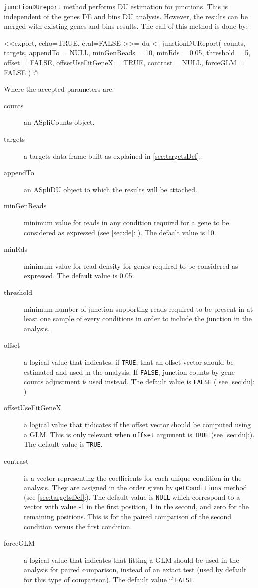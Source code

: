 \documentclass{article}
\newcommand{\secref}[1]{\ref{#1}:\nameref{#1}}
\begin{document}
\texttt{junctionDUreport} method performs DU estimation for junctions. This is
independent of the genes DE and bins DU analysis. However, the results can be
merged with existing genes and bins results. The call of this method is done by:

<<export, echo=TRUE, eval=FALSE >>=
du <- junctionDUReport(  counts, 
                         targets, 
                         appendTo = NULL, 
                         minGenReads = 10,
                         minRds = 0.05,
                         threshold = 5,
                         offset   = FALSE,
                         offsetUseFitGeneX = TRUE,
                         contrast = NULL,
                         forceGLM = FALSE )
@

Where the accepted parameters are:
\begin{description}
  \item[counts] an ASpliCounts object.
  \item[targets] a targets data frame built as explained in 
  \secref{sec:targetsDef}.
  \item[appendTo] an ASpliDU object to which the results will be attached.
  \item[minGenReads] minimum value for reads in any condition required for a
  gene to be considered as expressed (see \secref{sec:de} ). The default value
  is 10.
  \item[minRds] minimum value for read density for genes required to be
  considered as expressed. The default value is 0.05.
  \item[threshold] minimum number of junction supporting reads required to be
  present in at least one sample of every conditions in order to include the
  junction in the analysis.
  \item[offset] a logical value that indicates, if \texttt{TRUE}, that an offset
  vector should be estimated and used in the analysis. If \texttt{FALSE},
  junction counts by gene counts adjustment is used instead. The default value
  is \texttt{FALSE} ( see \secref{sec:du} )
  \item[offsetUseFitGeneX] a logical value that indicates if
  the offset vector should be computed using a GLM. This is only relevant when \texttt{offset}
  argument is \texttt{TRUE} (see \secref{sec:du}). The default value is \texttt{TRUE}.
  \item[contrast] is a vector representing the coefficients for each unique
  condition in the analysis. They are assigned in the order given by
  \texttt{getConditions} method (see \secref{sec:targetsDef}). The default value
  is \texttt{NULL} which correspond to a vector with value -1 in the first
  position, 1 in the second, and zero for the remaining positions. This is for
  the paired comparison of the second condition versus the first condition.
  \item[forceGLM] a logical value that indicates that fitting a GLM should be
  used in the analysis for paired comparison, instead of an extact test (used
  by default for this type of comparison). The default value if \texttt{FALSE}.
  
\end{description}
\end{document}
